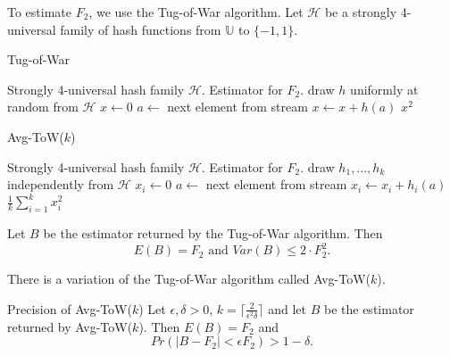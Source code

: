 \documentclass[english]{panikzettel}
\begin{document}
\begin{halfboxl}
\vspace{-\baselineskip}

To estimate $F_2$, we use the Tug-of-War algorithm.
Let $\mathcal{H}$ be a strongly 4-universal family of hash functions from $\mathbb{U}$ to $\{-1,1\}$.

\begin{algo}{Tug-of-War}
{
\renewcommand{\algorithmicrequire}{\textbf{Input:}}     \renewcommand{\algorithmicensure}{\textbf{Output:}}
  \begin{algorithmic}[1]
  \Require Strongly 4-universal hash family $\mathcal{H}$.
  \Ensure Estimator for $F_2$.
  \State draw $h$ uniformly at random from $\mathcal{H}$
  \State $x\leftarrow 0$
    \State $a\leftarrow $ next element from stream
    \State $x\leftarrow x + h(a)$
  \EndWhile
  \State \Return $x^2$
\end{algorithmic}
}
\end{algo}

\end{halfboxl}
\begin{halfboxr}
\vspace{-\baselineskip}

\begin{algo}{Avg-ToW($k$)}
	{
	\renewcommand{\algorithmicrequire}{\textbf{Input:}}     \renewcommand{\algorithmicensure}{\textbf{Output:}}
	  \begin{algorithmic}[1]
	  \Require Strongly 4-universal hash family $\mathcal{H}$.
	  \Ensure Estimator for $F_2$.
	  \State draw $h_1,...,h_k$ independently from $\mathcal{H}$
	    \State $x_i\leftarrow 0$
	  \EndFor
	    \State $a\leftarrow $ next element from stream
	      \State $x_i\leftarrow x_i + h_i(a)$
	    \EndFor
	  \EndWhile
	  \State \Return $\frac{1}{k}\sum_{i=1}^k x_i^2$
	\end{algorithmic}
	}
	\end{algo}

\end{halfboxr}



\begin{halfboxl}
\vspace{-\baselineskip}

Let $B$ be the estimator returned by the Tug-of-War algorithm. Then
\[
E(B)=F_2 \text{ and } Var(B)\leq 2\cdot F_2^2.
\]

There is a variation of the Tug-of-War algorithm called Avg-ToW($k$).
	
\end{halfboxl}
\begin{halfboxr}
\vspace{-\baselineskip}
	\begin{theo}{Precision of Avg-ToW($k$)}
	Let $\epsilon,\delta>0$, $k= \lceil \frac{2}{\epsilon^2\delta} \rceil$ and let $B$ be the estimator returned by Avg-ToW($k$). Then $E(B)=F_2$ and
	\[
	Pr(|B-F_2| < \epsilon F_2)>1-\delta.
	\]
	\end{theo}
\end{halfboxr}
\end{document}
